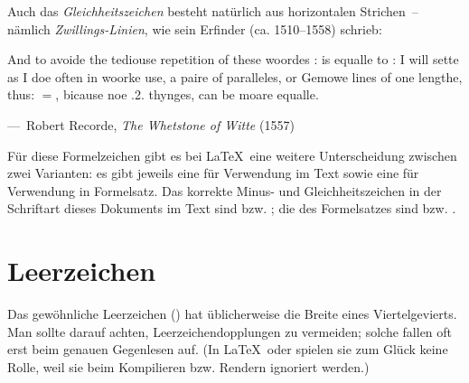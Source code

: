 Auch das \emph{Gleichheitszeichen} \Char{$=$} besteht natürlich aus horizontalen
Strichen~-- nämlich \emph{Zwillings-Linien}, wie sein Erfinder
 (ca. 1510--1558) schrieb:
\begin{displayquote}
  \foreignlanguage{british}{And to avoide the tediouse repetition of
    these woordes : is equalle to : I will sette as I doe often in
    woorke use, a paire of paralleles, or Gemowe lines of one lengthe,
    thus: $=$, bicause noe .2. thynges, can be moare equalle.}

  \quad---~Robert Recorde, \emph{The Whetstone of Witte} (1557)
\end{displayquote}

Für diese Formelzeichen gibt es bei \LaTeX\ eine weitere
Unterscheidung zwischen zwei Varianten: es gibt jeweils eine für
Verwendung im Text sowie eine für Verwendung in Formelsatz.  Das
korrekte Minus- und Gleichheitszeichen in der Schriftart dieses
Dokuments im Text sind \Char{\textminus} bzw. \Char{=}; die des
Formelsatzes sind \Char{$-$} bzw. \Char{$=$}.




\section{Leerzeichen}

Das gewöhnliche Leerzeichen () hat üblicherweise die Breite eines
Viertelgevierts. Man sollte darauf achten, Leerzeichendopplungen zu vermeiden;
solche fallen oft erst beim genauen Gegenlesen auf. (In \LaTeX\ oder 
spielen sie zum Glück keine Rolle, weil sie beim Kompilieren bzw. Rendern
ignoriert werden.)

